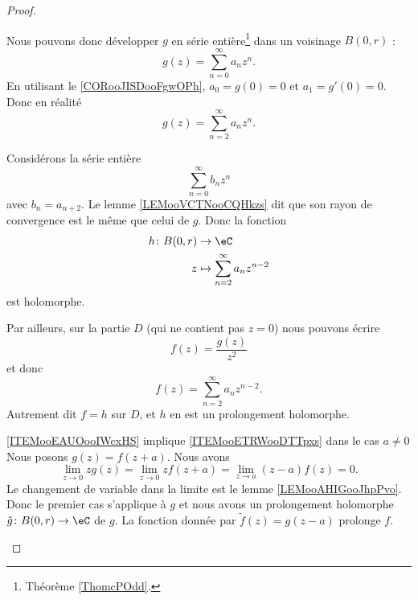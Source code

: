\begin{proof}
\begin{subproof}
            Nous pouvons donc développer \( g\) en série entière\footnote{Théorème \ref{ThomcPOdd}.} dans un voisinage \( B(0,r)\) :
            \begin{equation}
                g(z)=\sum_{n=0}^{\infty}a_nz^n.
            \end{equation}
            En utilisant le \ref{CORooJISDooFgwOPh}, \( a_0=g(0)=0\) et \( a_1=g'(0)=0\). Donc en réalité
            \begin{equation}
                g(z)=\sum_{n=2}^{\infty}a_nz^n.
            \end{equation}

            Considérons la série entière
            \begin{equation}
                \sum_{n=0}^{\infty}b_nz^n
            \end{equation}
            avec \( b_n=a_{n+2}\). Le lemme \ref{LEMooVCTNooCQHkzs} dit que son rayon de convergence est le même que celui de \( g\). Donc la fonction
            \begin{equation}
                \begin{aligned}
                    h\colon B(0,r)&\to \eC \\
                    z&\mapsto \sum_{n=2}^{\infty}a_nz^{n-2} 
                \end{aligned}
            \end{equation}
            est holomorphe.
            
            Par ailleurs, sur la partie \( D\) (qui ne contient pas \( z=0\)) nous pouvons écrire
            \begin{equation}
                f(z)=\frac{ g(z) }{ z^2 }
            \end{equation}
            et donc
            \begin{equation}
                f(z)=\sum_{n=2}^{\infty}a_nz^{n-2}.
            \end{equation}
            Autrement dit \( f=h\) sur \( D\), et \( h\) en est un prolongement holomorphe.
        \item[\ref{ITEMooEAUOooIWcxHS} implique \ref{ITEMooETRWooDTTpxs} dans le cas \( a\neq 0\)]
            Nous posons \( g(z)=f(z+a)\). Nous avons
            \begin{equation}
                \lim_{z\to 0}zg(z)=\lim_{z\to 0}zf(z+a)=\lim_{z\to a}(z-a)f(z)=0.
            \end{equation}
            Le changement de variable dans la limite est le lemme \ref{LEMooAHIGooJhpPvo}. Donc le premier cas s'applique à \( g\) et nous avons un prolongement holomorphe \( \tilde g\colon B(0,r)\to \eC\) de \( g\). La fonction donnée par \( \tilde f(z)=g(z-a)\) prolonge \( f\).
    \end{subproof}
\end{proof}

